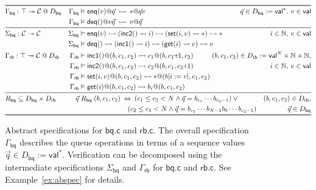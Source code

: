 \documentclass[acmsmall,screen,review,anonymous]{acmart}
\newcommand{\kw}[1]{\ensuremath{ \mathsf{#1} }}
\begin{document}
\begin{figure} %
  \small
\begin{align*}
\toprule
&
  \Gamma_\kw{bq} : \top \twoheadrightarrow \mathcal{C} \mathbin@ D_\kw{bq}
&  
  \Gamma_\kw{bq} &\vDash
      \kw{enq}(v) @ \vec{q}
      \:\rightarrowtail\:
      {*} @ \vec{q}v
&
  \hspace{-5em}
  \vec{q} \in D_\kw{bq} := \kw{val}^*, \:
  v \in \kw{val}
\\ &&
  \Gamma_\kw{bq} &\vDash
      \kw{deq}() @ v\vec{q}
      \:\rightarrowtail\:
      v @ \vec{q}
\\
\midrule
&
  \Sigma_\kw{bq} : \mathcal{C} \twoheadrightarrow \mathcal{C}
&
  \Sigma_\kw{bq} &\vDash
      \kw{enq}(v) \rightarrowtail
      (\kw{inc2}() \leadsto i) \rightarrowtail
      (\kw{set}(i, v) \leadsto *) \rightarrowtail
      *
&
  i \in \mathbb{N}, \:
  v \in \kw{val}
\\ &&
    \Sigma_\kw{bq} &\vDash
      \kw{deq}() \rightarrowtail
      (\kw{inc1}() \leadsto i) \rightarrowtail
      (\kw{get}(i) \leadsto v) \rightarrowtail
      v
\\ &
  \Gamma_\kw{rb} : \top \twoheadrightarrow \mathcal{C} \mathbin@ D_\kw{rb}
&
  \Gamma_\kw{rb} &\vDash
    \kw{inc1}()@(b, c_1, c_2) \rightarrowtail
    c_1@(b, c_1\!\!+\!\!1, c_2)
&
  \hspace{-8em}
  (b, c_1, c_2) \in D_\kw{rb} :=
    \kw{val}^N \times \mathbb{N} \times \mathbb{N},
\\ &&
  \Gamma_\kw{rb} &\vDash
    \kw{inc2}()@(b, c_1, c_2) \rightarrowtail
    c_2@(b, c_1, c_2\!\!+\!\!1)
&
  i \in \mathbb{N}, \:
  v \in \kw{val}
\\ &&
  \Gamma_\kw{rb} &\vDash
    \kw{set}(i, v)@(b, c_1, c_2) \rightarrowtail
    {*}@(b[i := v], c_1, c_2)
\\ &&
  \Gamma_\kw{rb} &\vDash
    \kw{get}(i)@(b, c_1, c_2) \rightarrowtail
    b_i@(b, c_1, c_2)
\\ \midrule &
  R_\kw{bq} \subseteq D_\kw{bq} \times D_\kw{rb}
&
        \vec{q} &\mathrel{R_\kw{bq}} (b, c_1, c_2) \: \Leftrightarrow \:
           (c_1 \le c_2 < N \wedge
            \vec{q} = b_{c_1} \cdots b_{c_2-1}) \vee {}
&
  (b, c_1, c_2) \in D_\kw{rb},
\\ &&
         & \hspace{16.3ex}
           (c_2 \le c_1 < N \wedge
            \vec{q} = b_{c_1} \cdots b_{N-1} b_0 \cdots b_{c_2 - 1})
&
  \vec{q} \in D_\kw{bq}
\\
\bottomrule
\end{align*}
\vspace{-2.5em}
  \caption{Abstract specifications for $\kw{bq.c}$ and $\kw{rb.c}$.
    The overall specification $\Gamma_\kw{bq}$
    describes the queue operations in terms of
    a sequence values $\vec{q} \in D_\kw{bq} := \kw{val}^*$.
    Verification can be decomposed using the intermediate specifications
    $\Sigma_\kw{bq}$ and $\Gamma_\kw{rb}$ for
    $\kw{bq.c}$ and $\kw{rb.c}$.
    See Example~\ref{ex:abspec} for details.}
  \label{fig:spec}
\end{figure}
\end{document}

